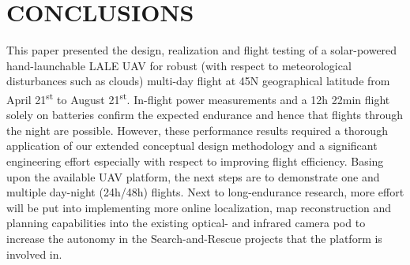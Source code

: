 \documentclass[letterpaper, 10 pt, conference]{ieeeconf}  %
\begin{document}
\section{CONCLUSIONS}
This paper presented the design, realization and flight testing of a solar-powered hand-launchable LALE UAV for robust (with respect to meteorological disturbances such as clouds) multi-day flight at 45\degree N geographical latitude from April 21\textsuperscript{st} to August 21\textsuperscript{st}. In-flight power measurements and a 12h 22min flight solely on batteries confirm the expected endurance and hence that flights through the night are possible. However, these performance results required a thorough application of our extended conceptual design methodology and a significant engineering effort especially with respect to improving flight efficiency. Basing upon the available UAV platform, the next steps are to demonstrate one and multiple day-night (24h/48h) flights. Next to long-endurance research, more effort will be put into implementing more online localization, map reconstruction and planning capabilities into the existing optical- and infrared camera pod to increase the autonomy in the Search-and-Rescue projects that the platform is involved in.

\addtolength{\textheight}{-12cm}   %





\end{document}
